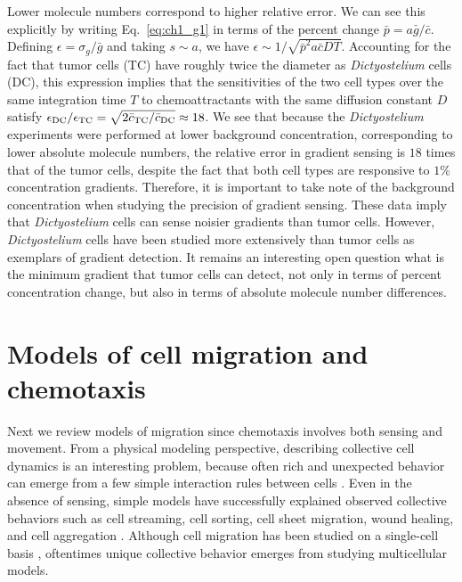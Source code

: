Lower molecule numbers correspond to higher relative error. We can see this explicitly by writing Eq.\ \ref{eq:ch1_g1} in terms of the percent change $\bar{p} = a\bar{g}/\bar{c}$. Defining $\epsilon = \sigma_g/\bar{g}$ and taking $s \sim a$, we have
$\epsilon \sim 1/\sqrt{\bar{p}^2a\bar{c}DT}$.
Accounting for the fact that tumor cells (TC) have roughly twice the diameter as \textit{Dictyostelium} cells (DC), this expression implies that the sensitivities of the two cell types over the same integration time $T$ to chemoattractants with the same diffusion constant $D$ satisfy
$\epsilon_{\rm DC}/\epsilon_{\rm TC} = \sqrt{2\bar{c}_{\rm TC}/\bar{c}_{\rm DC}} \approx 18$.
We see that because the \textit{Dictyostelium} experiments were performed at lower background concentration, corresponding to lower absolute molecule numbers, the relative error in gradient sensing is $18$ times that of the tumor cells, despite the fact that both cell types are responsive to $1\%$ concentration gradients. Therefore, it is important to take note of the background concentration when studying the precision of gradient sensing. These data imply that \textit{Dictyostelium} cells can sense noisier gradients than tumor cells. However, \textit{Dictyostelium} cells have been studied more extensively than tumor cells as exemplars of gradient detection. It remains an interesting open question what is the minimum gradient that tumor cells can detect, not only in terms of percent concentration change, but also in terms of absolute molecule number differences.


\section{Models of cell migration and chemotaxis}

Next we review models of migration since chemotaxis involves both sensing and movement. From a physical modeling perspective, describing collective cell dynamics is an interesting problem, because often rich and unexpected behavior can emerge from a few simple interaction rules between cells \cite{vicsek1995novel,coburn2013tactile}.
Even in the absence of sensing, simple models have successfully explained observed collective behaviors such as cell streaming, cell sorting, cell sheet migration, wound healing, and cell aggregation \cite{kabla2012collective,szabo2010collective,basan2013alignment,janulevicius2015short}.
Although cell migration has been studied on a single-cell basis \cite{shao2010computational}, oftentimes unique collective behavior emerges from studying multicellular models.


